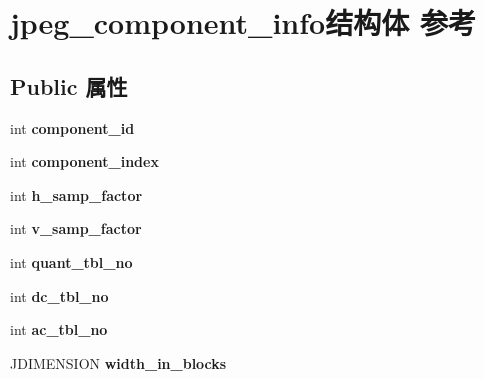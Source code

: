 \hypertarget{structjpeg__component__info}{}\section{jpeg\+\_\+component\+\_\+info结构体 参考}
\label{structjpeg__component__info}
\subsection*{Public 属性}
\begin{DoxyCompactItemize}
\item 
\mbox{\label{structjpeg__component__info_a205782ff7ec47c58cb470f121247ea8d}} 
int {\bfseries component\+\_\+id}
\item 
\mbox{\label{structjpeg__component__info_aa29b9e1c664a9b0b8a1c3069ad167817}} 
int {\bfseries component\+\_\+index}
\item 
\mbox{\label{structjpeg__component__info_a3a8e122fa2eee3c7bede586d371fe202}} 
int {\bfseries h\+\_\+samp\+\_\+factor}
\item 
\mbox{\label{structjpeg__component__info_a83b263da2a749a8fe96be728889af0df}} 
int {\bfseries v\+\_\+samp\+\_\+factor}
\item 
\mbox{\label{structjpeg__component__info_a0a9d70b6a95d3ca58a34a7ea8bfefbf8}} 
int {\bfseries quant\+\_\+tbl\+\_\+no}
\item 
\mbox{\label{structjpeg__component__info_a304fa583caa0601abc7077a218988854}} 
int {\bfseries dc\+\_\+tbl\+\_\+no}
\item 
\mbox{\label{structjpeg__component__info_adfea67573a39b232c3d82ac808539a83}} 
int {\bfseries ac\+\_\+tbl\+\_\+no}
\item 
\mbox{\label{structjpeg__component__info_a059454e8192effeabc6eab34e2ad198d}} 
J\+D\+I\+M\+E\+N\+S\+I\+ON {\bfseries width\+\_\+in\+\_\+blocks}
\item 
\mbox{\label{structjpeg__component__info_a3f9218e7590c328bfd88d900f58886f4}} 

\end{DoxyCompactItemize}

